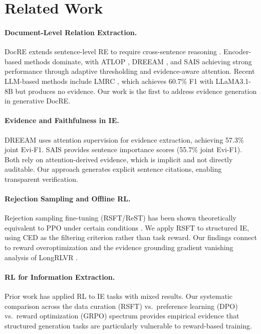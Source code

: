 \documentclass[11pt]{article}
\begin{document}
\section{Related Work}

\paragraph{Document-Level Relation Extraction.}
DocRE extends sentence-level RE to require cross-sentence reasoning \cite{yao2019docred}.
Encoder-based methods dominate, with ATLOP \cite{zhou2021atlop}, DREEAM \cite{ma2023dreeam}, and SAIS \cite{xiao2022sais} achieving strong performance through adaptive thresholding and evidence-aware attention.
Recent LLM-based methods include LMRC \cite{xu2024lmrc}, which achieves 60.7\% F1 with LLaMA3.1-8B but produces no evidence.
Our work is the first to address evidence generation in generative DocRE.

\paragraph{Evidence and Faithfulness in IE.}
DREEAM \cite{ma2023dreeam} uses attention supervision for evidence extraction, achieving 57.3\% joint Evi-F1.
SAIS \cite{xiao2022sais} provides sentence importance scores (55.7\% joint Evi-F1).
Both rely on attention-derived evidence, which is implicit and not directly auditable.
Our approach generates explicit sentence citations, enabling transparent verification.

\paragraph{Rejection Sampling and Offline RL.}
Rejection sampling fine-tuning (RSFT/ReST) has been shown theoretically equivalent to PPO under certain conditions \cite{dong2024raft}.
We apply RSFT to structured IE, using CED as the filtering criterion rather than task reward.
Our findings connect to reward overoptimization \cite{gao2023scaling} and the evidence grounding gradient vanishing analysis of LongRLVR \cite{song2025longrlvr}.

\paragraph{RL for Information Extraction.}
Prior work has applied RL to IE tasks with mixed results.
Our systematic comparison across the data curation (RSFT) vs.\ preference learning (DPO) vs.\ reward optimization (GRPO) spectrum provides empirical evidence that structured generation tasks are particularly vulnerable to reward-based training.
\end{document}
